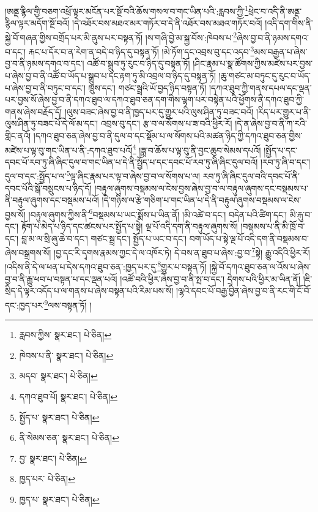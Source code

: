 །ཨནྡ་རྙིལ་གྱི་བཅག་འཕྲོ་ལྟར་མངོན་པར་སྔོ་བའི་ཆོས་གསལ་བ་གང་ཡིན་པའི་:རླབས་ཀྱི་\footnote{རླབས་ཀྱིས་  སྣར་ཐང་།  པེ་ཅིན། }ཕྲེང་བ་འདི་ནི་ཨནྡ་རྙིལ་ལྟར་མདོག་སྔོ་བའོ། །དེ་འཐོར་བས་མཐའ་མར་གཏོར་བ་དེ་ནི་འཐོར་བས་མཐའ་གཏོར་བའོ། །འདི་དག་གིས་ནི་སྐྱེ་བོ་གཞན་གྱིས་བགྲོད་པར་མི་ནུས་པར་བསྟན་ཏོ། །ས་གཞི་བྱེ་མ་སྐྱ་བོས་:ཁེབས་པ་\footnote{ཁེབས་པ་ནི་  སྣར་ཐང་།  པེ་ཅིན། }ཞེས་བྱ་བ་ནི་ཉམས་དགའ་བ་དང་། རྐང་པ་དོར་བ་ན་རེག་ན་བདེ་བ་ཉིད་དུ་བསྟན་ཏོ། །མེ་ཏོག་དང་འབྲས་བུ་དང་འདབ་\footnote{མདབ་  སྣར་ཐང་།  པེ་ཅིན། }མས་བརྒྱན་པ་ཞེས་བྱ་བ་ནི་ཉམས་དགའ་བ་དང་། འཚོ་བ་སྒྲུབ་ཏུ་རུང་བ་ཉིད་དུ་བསྟན་ཏོ། །ཤིང་རྣམ་པ་སྣ་ཚོགས་ཀྱིས་མཛེས་པར་བྱས་པ་ཞེས་བྱ་བ་ནི་འཚོ་བ་ཡོད་པ་སྒྲུབ་པ་དང་རྟག་ཏུ་མི་འབྲལ་བ་ཉིད་དུ་བསྟན་ཏོ། །ཆུ་གཙང་མ་བཏུང་དུ་རུང་བ་ཡོད་པ་ཞེས་བྱ་བ་ནི་བཏུང་བ་དང་། ཁྲུས་དང་། གཙང་སྦྲའི་ཡོ་བྱད་ཉིད་བསྟན་ཏོ། །དཀའ་ཐུབ་ཀྱི་གནས་དཔལ་དང་ལྡན་པར་བྱས་སོ་ཞེས་བྱ་བ་ནི་དཀའ་ཐུབ་ལ་དཀའ་ཐུབ་ཅན་དག་གིས་ལྷག་པར་བསྟེན་པའི་ཕྱོགས་ནི་དཀའ་ཐུབ་ཀྱི་གནས་ཞེས་བརྗོད་དོ། །ལུས་བཟང་ཞེས་བྱ་བ་ནི་ཁྱད་པར་དུ་གྱུར་པའི་ལུས་ཤིན་ཏུ་བཟང་བའོ། །རིད་པར་གྱུར་པ་ནི་ལུས་ཤིན་ཏུ་བཟང་པོ་དེ་ལོ་མ་དང་། འབྲས་བུ་དང་། རྩ་བ་ལ་སོགས་པ་ཟ་བའི་ཕྱིར་རོ། །དེ་ན་ཞེས་བྱ་བ་ནི་ཀ་རའི་གླིང་ནའོ། །དཀའ་ཐུབ་ཅན་ཞེས་བྱ་བ་ནི་དུལ་བ་དང་སྡོམ་པ་ལ་སོགས་པའི་མཚན་ཉིད་ཀྱི་དཀའ་ཐུབ་ཅན་གྱིས་མཛེས་པ་ལྟ་བུ་གང་ཡིན་པ་ནི་:དཀའ་ཐུབ་པའོ།\footnote{དཀའ་ཐུབ་པོ།  སྣར་ཐང་།  པེ་ཅིན། } །ཟླ་བ་ཆོས་པ་ལྟ་བུ་ནི་བྱང་ཆུབ་སེམས་དཔའོ། །སྤྱོད་པ་དང་དབང་པོ་རབ་ཏུ་ཞི་ཞིང་དུལ་བ་གང་ཡིན་པ་དེ་ནི་སྤྱོད་པ་དང་དབང་པོ་རབ་ཏུ་ཞི་ཞིང་དུལ་བའོ། །རབ་ཏུ་ཞི་བ་དང་། དུལ་བ་དང་:སྤྱོད་པ་ལ་\footnote{སྤྱོད་པ་  སྣར་ཐང་།  པེ་ཅིན། }ལྟ་ཞིང་རྣམ་པར་ལྟ་བ་ཞེས་བྱ་བ་ལ་སོགས་པ་ལ། རབ་ཏུ་ཞི་ཞིང་དུལ་བའི་དབང་པོ་ནི་དབང་པོའི་སྒོ་བསྲུངས་པ་ཉིད་དོ། །བརྟུལ་ཞུགས་བསྡམས་ལ་ངེས་བྱས་ཞེས་བྱ་བ་ལ་བརྟུལ་ཞུགས་དང་བསྡམས་པ་ནི་བརྟུལ་ཞུགས་དང་བསྡམས་པའོ། །དེ་གཉིས་ལ་རྩེ་གཅིག་པ་གང་ཡིན་པ་དེ་ནི་བརྟུལ་ཞུགས་བསྡམས་ལ་ངེས་བྱས་སོ། །བརྟུལ་ཞུགས་ཀྱིས་ནི་\footnote{ནི་སེམས་ཅན་  སྣར་ཐང་།  པེ་ཅིན། }བསྡམས་པ་ཡང་སྨོས་པ་ཡིན་ནོ། །མི་འཚེ་བ་དང་། བདེན་པའི་ཚིག་དང་། མི་རྐུ་བ་དང་། རྟོག་པ་མེད་པ་ཉིད་དང་ཚངས་པར་སྤྱོད་པ་སྟེ། ལྔ་པོ་འདི་དག་ནི་བརྟུལ་ཞུགས་སོ། །བསྡམས་པ་ནི་མི་ཁྲོ་བ་དང་། བླ་མ་ལ་སྲི་ཞུ་ཆེ་བ་དང་། གཙང་སྦྲ་དང་། སྤྱོད་པ་ཡང་བ་དང་། བག་ཡོད་པ་སྟེ་ལྔ་པོ་འདི་དག་ནི་བསྡམས་བ་ཞེས་བསྒྲགས་སོ། །བྱ་དང་རི་དྭགས་རྣམས་ཀྱང་དེ་ལ་འཁོར་ཏེ། དེ་བས་ན་ཐུབ་པ་ཞེས་:བྱ་བ་\footnote{བྱ་  སྣར་ཐང་།  པེ་ཅིན། }སྟེ། རྒྱུ་འདིའི་ཕྱིར་རོ། །འདིས་ནི་དེ་ལ་ཕན་པ་དེས་དཀའ་ཐུབ་ཅན་:ཁྱད་པར་དུ་\footnote{ཁྱད་པར་  པེ་ཅིན། }གྱུར་པ་བསྟན་ཏོ། །སྐྱེ་བོ་དཀའ་ཐུབ་ཅན་ལ་འོས་པ་ཞེས་བྱ་བ་ནི་རྒྱུ་ཕབ་པ་བསྟན་པ་དང་ལྡན་པའོ། །འཚོ་བའི་ཕྱིར་ཞེས་བྱ་བ་ནི་སྤ་བ་དང་། དྲེགས་པའི་ཕྱིར་མ་ཡིན་ནོ། །ཇི་སྲིད་དེ་ལྟར་འདོད་པ་ལ་གནས་པ་ཞེས་བསྟན་པའི་རིམ་པས་སོ། །ལྷའི་དབང་པོ་བརྒྱ་བྱིན་ཞེས་བྱ་བ་ནི་རང་གི་ངོ་བོ་དང་:ཁྱད་པར་\footnote{ཁྱད་པ་  སྣར་ཐང་།  པེ་ཅིན། }ལས་བསྟན་ཏོ། །
